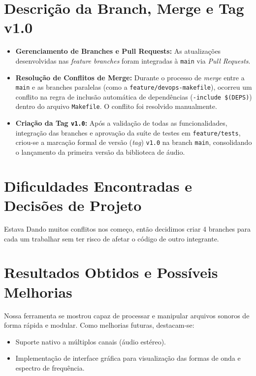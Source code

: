 \documentclass[12pt, a4paper]{article}
\begin{document}
\section{Descrição da Branch, Merge e Tag v1.0}
\begin{itemize}
    \item \textbf{Gerenciamento de Branches e Pull Requests:} As atualizações desenvolvidas nas \emph{feature branches} foram integradas à \texttt{main} via \emph{Pull Requests}.
    \item \textbf{Resolução de Conflitos de Merge:} Durante o processo de \emph{merge} entre a \texttt{main} e as branches paralelas (como a \texttt{feature/devops-makefile}), ocorreu um conflito na regra de inclusão automática de dependências (\texttt{-include \$(DEPS)}) dentro do arquivo \texttt{Makefile}. O conflito foi resolvido manualmente.
    \item \textbf{Criação da Tag \texttt{v1.0}:} Após a validação de todas as funcionalidades, integração das branches e aprovação da suíte de testes em \texttt{feature/tests}, criou-se a marcação formal de versão (\emph{tag}) \texttt{v1.0} na branch \texttt{main}, consolidando o lançamento da primeira versão da biblioteca de áudio.
\end{itemize}

\section{Dificuldades Encontradas e Decisões de Projeto}
Estava Dando muitos conflitos nos começo, então decidimos criar 4 branches para cada um trabalhar sem ter risco de afetar o código de outro integrante.

\section{Resultados Obtidos e Possíveis Melhorias}
Nossa ferramenta se mostrou capaz de processar e manipular arquivos sonoros de forma rápida e modular. Como melhorias futuras, destacam-se:
\begin{itemize}
    \item Suporte nativo a múltiplos canais (áudio estéreo).
    \item Implementação de interface gráfica para visualização das formas de onda e espectro de frequência.
\end{itemize}
\end{document}
